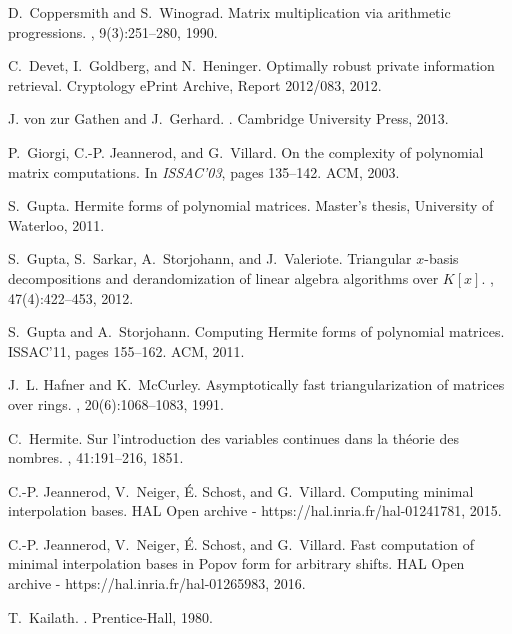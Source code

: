 \documentclass[preprint]{sig-alternate-05-2015}
\begin{document}
\begin{tiny}
\begin{thebibliography}{10}
D.~Coppersmith and S.~Winograd.
\newblock Matrix multiplication via arithmetic progressions.
, 9(3):251--280, 1990.

C.~Devet, I.~Goldberg, and N.~Heninger.
\newblock Optimally robust private information retrieval.
\newblock Cryptology ePrint Archive, Report 2012/083, 2012.

{J. von zur} Gathen and J.~Gerhard.
.
\newblock Cambridge University Press, 2013.

P.~Giorgi, C.-P. Jeannerod, and G.~Villard.
\newblock On the complexity of polynomial matrix computations.
\newblock In {\em ISSAC'03}, pages 135--142. ACM, 2003.

S.~Gupta.
\newblock Hermite forms of polynomial matrices.
\newblock Master's thesis, University of Waterloo, 2011.

S.~Gupta, S.~Sarkar, A.~Storjohann, and J.~Valeriote.
\newblock Triangular $x$-basis decompositions and derandomization of linear
  algebra algorithms over ${K}[x]$.
, 47(4):422--453, 2012.

S.~Gupta and A.~Storjohann.
\newblock Computing {H}ermite forms of polynomial matrices.
\newblock ISSAC'11, pages 155--162. ACM, 2011.

J.~L. Hafner and K.~McCurley.
\newblock Asymptotically fast triangularization of matrices over rings.
, 20(6):1068--1083, 1991.

C.~Hermite.
\newblock Sur l'introduction des variables continues dans la th\'eorie des
  nombres.
, 41:191--216,
  1851.

C.-P. Jeannerod, V.~Neiger, \'E. Schost, and G.~Villard.
\newblock Computing minimal interpolation bases.
\newblock HAL Open archive - https://hal.inria.fr/hal-01241781, 2015.

C.-P. Jeannerod, V.~Neiger, \'E. Schost, and G.~Villard.
\newblock Fast computation of minimal interpolation bases in {Popov} form for
  arbitrary shifts.
\newblock HAL Open archive - https://hal.inria.fr/hal-01265983, 2016.

T.~Kailath.
.
\newblock Prentice-Hall, 1980.


\end{thebibliography}
\end{tiny}
\end{document}
